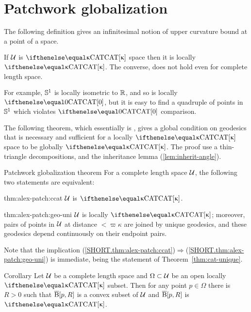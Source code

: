 
\section{Patchwork globalization}\label{sec:patchwork}

The following definition gives an infinitesimal 
 notion of upper curvature bound at a point of a space.
 


If $\mathcal{U}$ is $\CAT\kappa$ space then it is locally $\CAT\kappa$.
The converse, does not hold even for complete length space.

For example, $\mathbb{S}^1$ is locally isometric to $\mathbb{R}$, and so
is locally $\CAT0$, but it is easy to find a quadruple of points in $\mathbb{S}^1$ which violates $\CAT0$ comparison.  

The following theorem, 
which essentially is  \cite[Satz 9]{alexandrov:devel}, 
gives a global condition on geodesics that is  necessary and sufficient for a locally $\CAT\kappa$ space to be globally $\CAT\kappa$. 
The proof use a thin-triangle decompositions, 
and the inheritance lemma (\ref{lem:inherit-angle}). 

\begin{thm}{Patchwork globalization theorem}\label{thm:alex-patch}
For a complete length space $\mathcal{U}$, the following two statements are equivalent:

\begin{subthm}{thm:alex-patch:ccat}
$\mathcal{U}$ is $\CAT\kappa$.
\end{subthm}
 
\begin{subthm}{thm:alex-patch:geo-uni}
$\mathcal{U}$ is locally $\CAT\kappa$; moreover,  pairs of points in $\mathcal{U}$ at distance $<\varpi\kappa$ are joined by unique geodesics, and these geodesics depend continuously on their endpoint pairs.
\end{subthm}

\end{thm}

Note that the implication (\ref{SHORT.thm:alex-patch:ccat})$\Rightarrow$(\ref{SHORT.thm:alex-patch:geo-uni})
is immediate, being the statement of Theorem~\ref{thm:cat-unique}.

\begin{thm}{Corollary}\label{cor:k-for-k}
Let $\mathcal{U}$ be a complete length  space 
and $\Omega\subset\spc{U}$ be an open locally $\CAT\kappa$ subset. 
Then for any point $p\in \Omega$ there is $R>0$ such that $\overline{\mathrm{B}}{}[p,R]$ is a convex subset of $\mathcal{U}$ 
and $\overline{\mathrm{B}}{}[p,R]$ is $\CAT\kappa$.
\end{thm}

